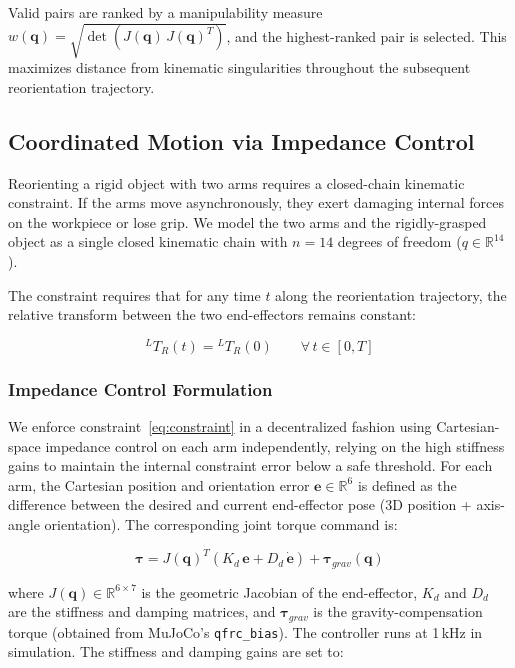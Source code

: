 \documentclass[letterpaper, 10 pt, conference]{ieeeconf}  %
\begin{document}
Valid pairs are ranked by a manipulability measure
$w(\bm{q}) = \sqrt{\det(J(\bm{q})\,J(\bm{q})^T)}$, and the highest-ranked
pair is selected. This maximizes distance from kinematic singularities
throughout the subsequent reorientation trajectory.

\subsection{Coordinated Motion via Impedance Control}
\label{sec:motion}

Reorienting a rigid object with two arms requires a closed-chain kinematic
constraint. If the arms move asynchronously, they exert damaging internal
forces on the workpiece or lose grip. We model the two arms and the
rigidly-grasped object as a single closed kinematic chain with
$n = 14$ degrees of freedom ($q \in \mathbb{R}^{14}$).

The constraint requires that for any time $t$ along the reorientation
trajectory, the relative transform between the two end-effectors remains
constant:

\begin{equation}
    ^{L}T_{R}(t) = {^{L}T_{R}}(0) \qquad \forall\, t \in [0, T]
    \label{eq:constraint}
\end{equation}

\subsubsection{Impedance Control Formulation}

We enforce constraint~\eqref{eq:constraint} in a decentralized fashion using
Cartesian-space impedance control on each arm independently, relying on the
high stiffness gains to maintain the internal constraint error below a safe
threshold. For each arm, the Cartesian position and orientation error
$\bm{e} \in \mathbb{R}^6$ is defined as the difference between the desired
and current end-effector pose (3D position + axis-angle orientation). The
corresponding joint torque command is:

\begin{equation}
    \bm{\tau} = J(\bm{q})^T \!\left(K_d\,\bm{e} + D_d\,\dot{\bm{e}}\right)
                + \bm{\tau}_{grav}(\bm{q})
    \label{eq:impedance}
\end{equation}

where $J(\bm{q}) \in \mathbb{R}^{6 \times 7}$ is the geometric Jacobian of
the end-effector, $K_d$ and $D_d$ are the stiffness and damping matrices, and
$\bm{\tau}_{grav}$ is the gravity-compensation torque (obtained from MuJoCo's
\texttt{qfrc\_bias}). The controller runs at 1\,kHz in simulation. The
stiffness and damping gains are set to:
\end{document}
